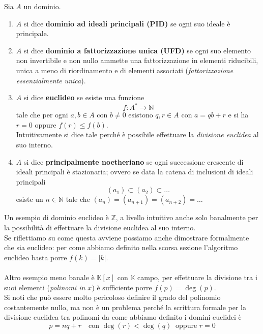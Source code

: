 \begin{definizione}
	Sia $A$ un dominio.
	\begin{enumerate}
		\item $A$ si dice \textbf{dominio ad ideali principali (PID)} se ogni suo ideale è principale.
		\item $A$ si dice \textbf{dominio a fattorizzazione unica (UFD)} se ogni suo elemento non invertibile e non nullo ammette una fattorizzazione in elementi riducibili, unica a meno di riordinamento e di elementi associati (\textit{fattorizzazione essenzialmente unica}).
		\item $A$ si dice \textbf{euclideo} se esiste una funzione 
		\begin{equation*}
		f: A^*\longrightarrow \mathbb{N}
		\end{equation*}
		tale che per ogni $a,b\in A$ con $b \neq 0$ esistono $q,r \in A$ con $a=qb+r$ e si ha $r=0$ oppure $f(r)\leq f(b)$. \\
		Intuitivamente si dice tale perché è possibile effettuare la \textit{divisione euclidea} al suo interno.
		\item $A$ si dice \textbf{principalmente noetheriano} se ogni successione crescente di ideali principali è stazionaria; ovvero se data la catena di inclusioni di ideali principali
		\begin{equation*}
		(a_1)\subset(a_2)\subset \dots
		\end{equation*}
		esiste un $n\in\mathbb{N}$ tale che $(a_n)=(a_{n+1})=(a_{n+2})=\dots$
	\end{enumerate}
\end{definizione}
\begin{esempio}
	Un esempio di dominio euclideo è $\mathbb{Z}$, a livello intuitivo anche solo banalmente per la possibilità di effettuare la divisione euclidea al suo interno. \\ Se riflettiamo su come questa avviene possiamo anche dimostrare formalmente che sia euclideo: per come abbiamo definito nella scorsa sezione l'algoritmo euclideo basta porre $f(k)=|k|$. \\ \\ Altro esempio meno banale è $\mathbb{K}[x]$ con $\mathbb{K}$ campo, per effettuare la divisione tra i suoi elementi (\textit{polinomi in $x$}) è sufficiente porre $f(p)=\deg(p)$. \\ Si noti che può essere molto pericoloso definire il grado del polinomio costantemente nullo, ma non è un problema perché la scrittura formale per la divisione euclidea tra polinomi da come abbiamo definito i domini euclidei è 
	\begin{equation*}
	p=nq+r \ \ \ \text{ con } \deg(r)<\deg(q) \ \text{ oppure } r=0
	\end{equation*}
\end{esempio}





